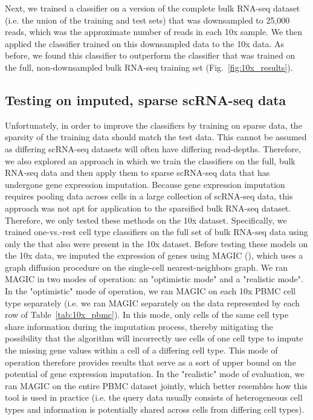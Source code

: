 Next, we trained a classifier on a version of the complete bulk RNA-seq dataset (i.e. the union of the training and test sets) that was downsampled to 25,000 reads, which was the approximate number of reads in each 10x sample. We then applied the classifier trained on this downsampled data to the 10x data. As before, we found this classifier to outperform the classifier that was trained on the full, non-downsampled bulk RNA-seq training set (Fig.~\ref{fig:10x_results}).

\subsection{Testing on imputed, sparse scRNA-seq data}

Unfortunately, in order to improve the classifiers by training on sparse data, the sparsity of the training data should match the test data. This cannot be assumed as differing scRNA-seq datasets will often have differing read-depths. Therefore, we also explored an approach in which we train the classifiers on the full, bulk RNA-seq data and then apply them to sparse scRNA-seq data that has undergone gene expression imputation.  Because gene expression imputation requires pooling data across cells in a large collection of scRNA-seq data, this approach was not apt for application to the sparsified bulk RNA-seq dataset. Therefore, we only tested these methods on the 10x dataset.  Specifically, we trained one-vs.-rest cell type classifiers on the full set of bulk RNA-seq data using only the \NumTenXIntersection{} that also were present in the 10x dataset. Before testing these models on the 10x data, we imputed the expression of genes using MAGIC (\citealp{Dijk2018}), which uses a graph diffusion procedure on the single-cell nearest-neighbors graph.  We ran MAGIC in two modes of operation: an "optimistic mode" and a "realistic mode".  In the "optimistic" mode of operation, we ran MAGIC on each 10x PBMC cell type separately (i.e. we ran MAGIC separately on the data represented by each row of Table~\ref{tab:10x_pbmc}).  In this mode, only cells of the same cell type share information during the imputation process, thereby mitigating the possibility that the algorithm will incorrectly use cells of one cell type to impute the missing gene values within a cell of a differing cell type.  This mode of operation therefore provides results that serve as a sort of upper bound on the potential of gene expression imputation.  In the "realistic" mode of evaluation, we ran MAGIC on the entire PBMC dataset jointly, which better resembles how this tool is used in practice (i.e. the query data usually consists of heterogeneous cell types and information is potentially shared across cells from differing cell types).

